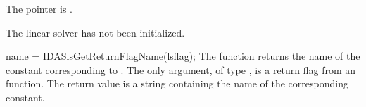 {{\begin{args}
    The  pointer is .
  \item[\Id{IDASLS\_LMEM\_NULL}]
    The {\idasls} linear solver has not been initialized.
  \end{args}
}
{
}
{
  name = IDASlsGetReturnFlagName(lsflag);
}
{
  The function  returns the
  name of the {\idasls} constant corresponding to .
}
{
  The only argument, of type , is a return flag from an {\idasls} function.
}
{
  The return value is a string containing the name of the corresponding constant.
}
{}

%
%
}
